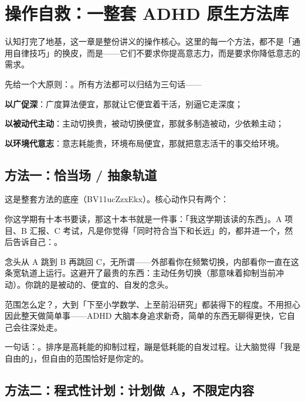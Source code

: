 \section{操作自救：一整套 ADHD 原生方法库}

认知打完了地基，这一章是整份讲义的操作核心。这里的每一个方法，都不是「通用自律技巧」的换皮，而是——它们不要求你提高意志力，而是要求你降低意志的需求。

先给一个大原则：。所有方法都可以归结为三句话——

\begin{checklist}
  \item \textbf{以广促深}：广度算法便宜，那就让它便宜着干活，别逼它走深度；
  \item \textbf{以被动代主动}：主动切换贵，被动切换便宜，那就多制造被动，少依赖主动；
  \item \textbf{以环境代意志}：意志耗能贵，环境布局便宜，那就把意志活干的事交给环境。
\end{checklist}

\subsection{方法一：恰当场 / 抽象轨道}

这是整套方法的底座（BV11ucZzxEkx）。核心动作只有两个：

你这学期有十本书要读，那这十本书就是一件事：「我这学期该读的东西」。A 项目、B 汇报、C 考试，凡是你觉得「同时符合当下和长远」的，都并进一个，然后告诉自己：。

念头从 A 跳到 B 再跳回 C，无所谓——外部看你在频繁切换，内部看你一直在这条宽轨道上运行。这避开了最贵的东西：主动任务切换（那意味着抑制当前冲动）。你跳的是被动的、便宜的、自发的念头。

范围怎么定？，大到「下至小学数学、上至前沿研究」都装得下的程度。不用担心因此整天做简单事——ADHD 大脑本身追求新奇，简单的东西无聊得更快，它自己会往深处走。

\begin{insight}
一句话：。排序是高耗能的抑制过程，蹦是低耗能的自发过程。让大脑觉得「我是自由的」，但自由的范围恰好是你定的。
\end{insight}

\subsection{方法二：程式性计划：计划做 A，不限定内容}

